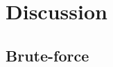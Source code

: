 \FloatBarrier

\section{Discussion}
\label{merge_intervals_2:sec:discussion_1}


\subsection{Brute-force}
\label{merge_intervals_2:sec:bruteforce_1}



